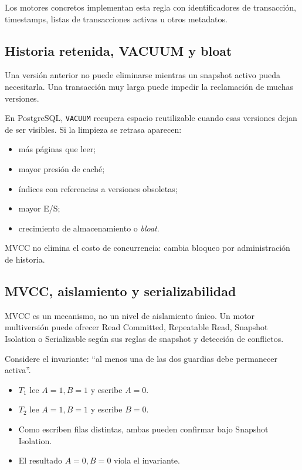 \documentclass[variant=apuntes,cover=institutional,mode=screen]{ua-engineering-v6-article}
\begin{document}
Los motores concretos implementan esta regla con identificadores de transacción, timestamps, listas de transacciones activas u otros metadatos.

\subsection{Historia retenida, VACUUM y bloat}

Una versión anterior no puede eliminarse mientras un snapshot activo pueda necesitarla. Una transacción muy larga puede impedir la reclamación de muchas versiones.

En PostgreSQL, \texttt{VACUUM} recupera espacio reutilizable cuando esas versiones dejan de ser visibles. Si la limpieza se retrasa aparecen:

\begin{itemize}
\item más páginas que leer;
\item mayor presión de caché;
\item índices con referencias a versiones obsoletas;
\item mayor E/S;
\item crecimiento de almacenamiento o \emph{bloat}.
\end{itemize}

MVCC no elimina el costo de concurrencia: cambia bloqueo por administración de historia.

\subsection{MVCC, aislamiento y serializabilidad}

MVCC es un mecanismo, no un nivel de aislamiento único. Un motor multiversión puede ofrecer Read Committed, Repeatable Read, Snapshot Isolation o Serializable según sus reglas de snapshot y detección de conflictos.

Considere el invariante: ``al menos una de las dos guardias debe permanecer activa''.

\begin{itemize}
\item $T_1$ lee $A=1,B=1$ y escribe $A=0$.
\item $T_2$ lee $A=1,B=1$ y escribe $B=0$.
\item Como escriben filas distintas, ambas pueden confirmar bajo Snapshot Isolation.
\item El resultado $A=0,B=0$ viola el invariante.
\end{itemize}
\end{document}
